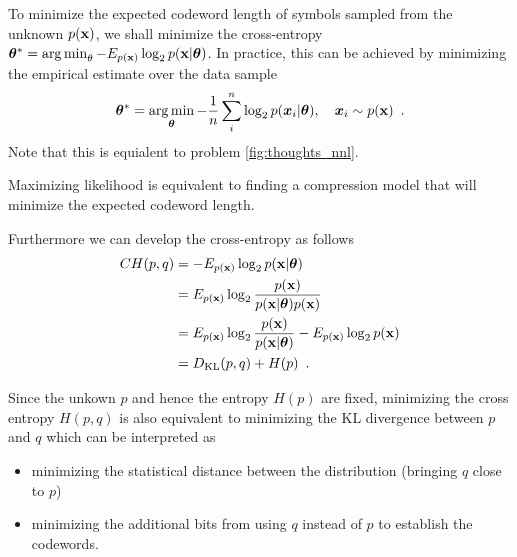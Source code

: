 To minimize the expected codeword length of symbols sampled from the unknown $p({\mathbf{x}})$, we shall minimize the cross-entropy ${\bm{\theta}}^* = \operatorname*{arg\,min}_\theta - E_{p({\mathbf{x}})} \log_2 p({\mathbf{x}} | {\bm{\theta}})$. 
In practice, this can be achieved by minimizing the empirical estimate over the data sample
\begin{align}\label{fig:thoughts_ce}
{\bm{\theta}}^* = \operatorname*{arg\,min}_{\bm{\theta}} - \frac{1}{n} \sum_i^n \log_2 p({\bm{x}}_i | {\bm{\theta}}), \quad {\bm{x}}_i \sim p({\mathbf{x}}) \enspace .
\end{align}
Note that this is equialent to problem \eqref{fig:thoughts_nnl}.
\begin{notebox}
Maximizing likelihood is equivalent to finding a compression model that will minimize the expected codeword length.
\end{notebox}

Furthermore we can develop the cross-entropy as follows
\begin{align}\label{fig:thoughts_kl}
CH(p, q) & = - E_{p({\mathbf{x}})} \log_2 p({\mathbf{x}} | {\bm{\theta}}) \nonumber \\
& = E_{p({\mathbf{x}})} \log_2 \frac{p({\mathbf{x}})}{p({\mathbf{x}} | {\bm{\theta}})p({\mathbf{x}})} \nonumber \\
& = E_{p({\mathbf{x}})} \log_2 \frac{p({\mathbf{x}})}{p({\mathbf{x}} | {\bm{\theta}})} - E_{p({\mathbf{x}})} \log_2 p({\mathbf{x}}) \nonumber \\
& = D_{\mathrm{KL}}(p, q) + H(p) \enspace .
\end{align}

Since the unkown $p$ and hence the entropy $H(p)$ are fixed, minimizing the cross entropy $H(p, q)$ is also equivalent to minimizing the KL divergence between $p$ and $q$ which can be interpreted as
\begin{itemize}[noitemsep, topsep=0pt]
\item minimizing the statistical distance between the distribution (bringing $q$ close to $p$)
\item minimizing the additional bits from using $q$ instead of $p$ to establish the codewords.
\end{itemize}

